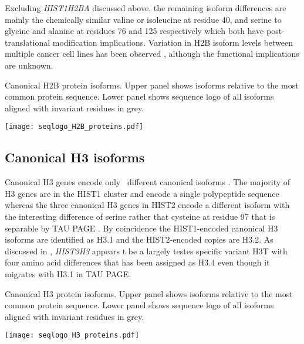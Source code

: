     Excluding \textit{HIST1H2BA} discussed above,
    the remaining isoform differences are mainly the chemically
    similar valine or isoleucine at residue 40,
    and serine to glycine and alanine at residues 76 and 125 respectively
    which both have post-translational modification implications.
    Variation in H2B isoform levels between multiple cancer cell
    lines has been observed \citep{Molden2015},
    although the functional implications are unknown.

    \begin{table}
      \caption{
        Canonical H2B protein isoforms.  Upper panel shows isoforms
        relative to the most common protein sequence.  Lower panel
        shows sequence logo of all isoforms aligned with invariant
        residues in grey.
      }
      \label{tab:H2B-consensus}
      
      \texttt{[image: seqlogo\_H2B\_proteins.pdf]}
    \end{table}

  \subsection{Canonical H3 isoforms}
    Canonical H3 genes encode only \HThreeUniqueProteins{}~different
    canonical isoforms .
    The majority of H3 genes are in the HIST1 cluster and encode a
    single polypeptide sequence \citep{Ederveen2011}
    whereas the three canonical H3 genes in HIST2 encode a different isoform
    with the interesting difference of serine rather that cysteine at residue 97
    that is separable by TAU PAGE \citep{FranklinZweidler1977}.
    By coincidence the HIST1-encoded canonical H3 isoforms are
    identified as H3.1 and the HIST2-encoded copies are H3.2.
    As discussed in , \textit{HIST3H3} appears t
     be a largely testes specific variant H3T
    with four amino acid differences that has been assigned as H3.4 \citep{Talbert2012}
    even though it migrates with H3.1 in TAU PAGE.

    \begin{table}
      \caption{
        Canonical H3 protein isoforms.  Upper panel shows isoforms
        relative to the most common protein sequence.  Lower panel
        shows sequence logo of all isoforms aligned with invariant
        residues in grey.
      }
      \label{tab:H3-consensus}
      
      \texttt{[image: seqlogo\_H3\_proteins.pdf]}
    \end{table}

